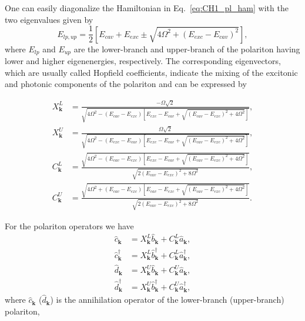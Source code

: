 One can easily diagonalize the Hamiltonian in Eq.~\eqref{eq:CH1_pl_ham} with the two eigenvalues given by
\begin{equation}
    E_{lp,up} = \frac{1}{2}\left[ E_{cav} + E_{exc} \pm \sqrt{4\Omega^2+\left(E_{exc}-E_{cav}\right)^2}\right],
    \label{eq:Ch1_eigv}
\end{equation}
where $E_{lp}$ and $E_{up}$ are the lower-branch and upper-branch of the polariton having lower and higher eigenenergies, respectively.
The corresponding eigenvectors, which are usually called Hopfield coefficients, indicate the mixing of the excitonic and photonic components of the polariton and can be expressed by~\cite{Flayac:2012aa}
\begin{large}
\begin{eqnarray}
X_\mathbf{k}^L &= \frac{-\Omega \sqrt{2}}{\sqrt{4\Omega^2-\left(E_{cav}-E_{exc}\right)\left[ E_{exc}-E_{cav} + \sqrt{\left(E_{cav}-E_{exc} \right)^2+4\Omega^2}\right] }}, \\
X_\mathbf{k}^U &= \frac{\Omega \sqrt{2}}{\sqrt{4\Omega^2-\left(E_{exc}-E_{cav}\right)\left[ E_{exc}-E_{cav} + \sqrt{\left(E_{cav}-E_{exc} \right)^2+4\Omega^2}\right] }}, \\
C_\mathbf{k}^L &= \frac{\sqrt{4\Omega^2-\left( E_{cav}-E_{exc}\right) \left[E_{exc}-E_{cav} +\sqrt{\left( E_{cav}-E_{exc}\right)^2+4\Omega^2}\right]}}{\sqrt{2\left(  E_{cav}-E_{exc}\right)^2 +8\Omega^2}}, \\
C_\mathbf{k}^U &= \frac{\sqrt{4\Omega^2+\left( E_{cav}-E_{exc}\right) \left[E_{cav}-E_{exc} +\sqrt{\left( E_{cav}-E_{exc}\right)^2+4\Omega^2}\right]}}{\sqrt{2\left(  E_{cav}-E_{exc}\right)^2 +8\Omega^2}}.
\label{eq:Ch1_eigenvector}
\end{eqnarray}
\end{large}
For the polariton operators we have
%
\begin{eqnarray}
    \hat{c}_\mathbf{k} &= X_\mathbf{k}^L\hat{b}_\mathbf{k} + C_\mathbf{k}^L\hat{a}_\mathbf{k},\\
    \hat{c}_\mathbf{k}^{\dagger} &= X_\mathbf{k}^L\hat{b}^\dagger_\mathbf{k} + C_\mathbf{k}^L\hat{a}_\mathbf{k}^\dagger,\\
    \hat{d}_\mathbf{k} &= X_\mathbf{k}^U\hat{b}_\mathbf{k} + C_\mathbf{k}^U\hat{a}_\mathbf{k},\\
    \hat{d}_\mathbf{k}^\dagger &= X_\mathbf{k}^U\hat{b}_\mathbf{k}^\dagger + C_\mathbf{k}^U\hat{a}_\mathbf{k}^\dagger,
    \label{eq:Ch1_hope}
\end{eqnarray}
%
where $\hat{c}_\mathbf{k}$ ($\hat{d}_\mathbf{k}$) is the annihilation operator of the lower-branch (upper-branch) polariton,
